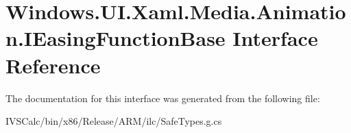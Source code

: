 \hypertarget{interface_windows_1_1_u_i_1_1_xaml_1_1_media_1_1_animation_1_1_i_easing_function_base}{}\section{Windows.\+U\+I.\+Xaml.\+Media.\+Animation.\+I\+Easing\+Function\+Base Interface Reference}
\label{interface_windows_1_1_u_i_1_1_xaml_1_1_media_1_1_animation_1_1_i_easing_function_base}


The documentation for this interface was generated from the following file\+:\begin{DoxyCompactItemize}
\item 
I\+V\+S\+Calc/bin/x86/\+Release/\+A\+R\+M/ilc/Safe\+Types.\+g.\+cs\end{DoxyCompactItemize}
